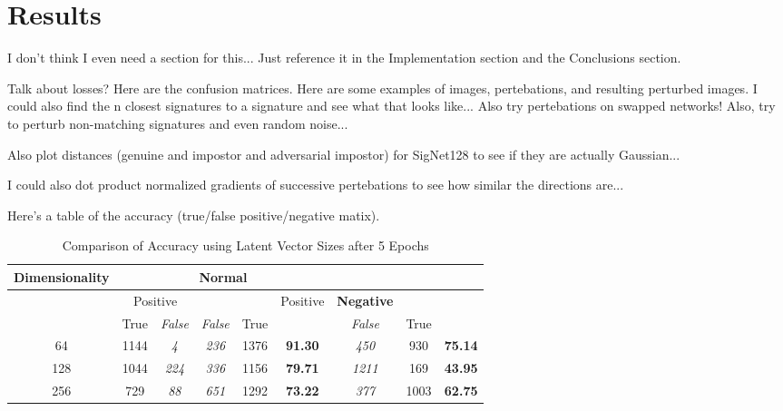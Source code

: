 \section{Results}\label{sec:results}

I don't think I even need a section for this...
Just reference it in the Implementation section and the Conclusions section.

Talk about losses?
Here are the confusion matrices.
Here are some examples of images, pertebations, and resulting perturbed images.
I could also find the n closest signatures to a signature and see what that looks like...
Also try pertebations on swapped networks!
Also, try to perturb non-matching signatures and even random noise...

Also plot distances (genuine and impostor and adversarial impostor) for SigNet128 to see if they are actually Gaussian...

I could also dot product normalized gradients of successive pertebations to see how similar the directions are...

Here's a table of the accuracy (true/false positive/negative matix).

\begin{table}[t]
    \centering
    \begin{tabular}{|c | c >{\em}c | >{\em}c c | >{\bfseries}c | >{\em}c c >{\bfseries}c|}
        \hline
        \multirow{3}{*}{Dimensionality} & \multicolumn{5}{c|}{Normal} & \multicolumn{3}{c|}{Adversarial}\\
        \hline
        & \multicolumn{2}{c|}{Positive} & \multicolumn{2}{c|}{Negative} & \multirow{2}{*}{Accuracy} & Positive & Negative & \multirow{2}{*}{Accuracy}\\
        & True & False & False & True & & False & True & \\
        \hline
        64 & 1144 & 4 & 236 & 1376 & 91.30 & 450 & 930 & 75.14\\
        128 & 1044 & 224 & 336 & 1156 & 79.71 & 1211 & 169 & 43.95\\
        256 & 729 & 88 & 651 & 1292 & 73.22 & 377 & 1003 & 62.75\\ [0.1ex]
        \hline
    \end{tabular}
    \caption{Comparison of Accuracy using Latent Vector Sizes after 5 Epochs}
    \label{table:1}
\end{table}

